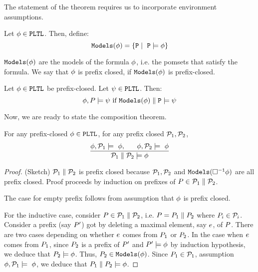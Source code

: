 The statement of the theorem requires us to incorporate environment assumptions.  
\begin{definition}
Let $\phi \in {\tt PLTL}$.  Then, define:
\[ \tt Models{(\phi)} = \{ P \mid \ P \models \phi \} \]
\end{definition}
$ \tt Models{(\phi)}$ are the models of the formula $\phi$, i.e. the pomsets that satisfy the formula.    We say that $\phi$ is prefix closed, if $ \tt Models{(\phi)}$ is prefix-closed.

\begin{definition}
Let $\phi \in {\tt PLTL}$ be prefix-closed.  Let $ \psi \in {\tt PLTL}$.  Then:
\[ \phi, P \models \psi  \mbox{ if } \tt Models{(\phi)} \parallel P \models \psi \]
\end{definition}
Now, we are ready to state the composition theorem.  
\begin{lemma}[Composition]
For any prefix-closed $\phi \in {\tt PLTL}$, for any prefix closed $\mathcal{P}_1, \mathcal{P}_2$, \[
\frac{\phi, \mathcal{P}_1 \models\ \phi, \ \ \ \ \ \phi, \mathcal{P}_2 \models\ \phi}{\mathcal{P}_1 \parallel \mathcal{P}_2 \models \phi}
\]
\end{lemma}
\begin{proof}(Sketch)
$\mathcal{P}_1 \parallel \mathcal{P}_2$ is prefix closed because $\mathcal{P}_1,\mathcal{P}_2$ and $ \tt Models{(\Box^{-1}\phi)}$ are all prefix closed.  Proof proceeds by induction on prefixes of $P \in \mathcal{P}_1 \parallel \mathcal{P}_2$.    

The case for empty prefix  follows from assumption that  $\phi$ is prefix closed.  

For the inductive case, consider $P \in \mathcal{P}_1 \parallel \mathcal{P}_2$, i.e. $P = P_1 \parallel P_2$ where $P_i \in \mathcal{P}_i$.  Consider a prefix (say $P'$) got by deleting a maximal element, say $e$, of $P$.  There are two cases depending on whether $e$ comes from $P_1$ or $P_2$.  In the case when $e$ comes from $P_1$, since $P_2$ is a prefix of $P'$ and $P' \models \phi$ by induction hypothesis, we deduce that  $P_2 \models \phi$.     Thus, $P_2 \in \tt Models{(\phi)}$.  Since $P_1 \in \mathcal{P}_1$, assumption $\phi, \mathcal{P}_1 \models\ \phi$,  we deduce that $P_1 \parallel P_2 \models \phi$.   
\end{proof}

\endinput

